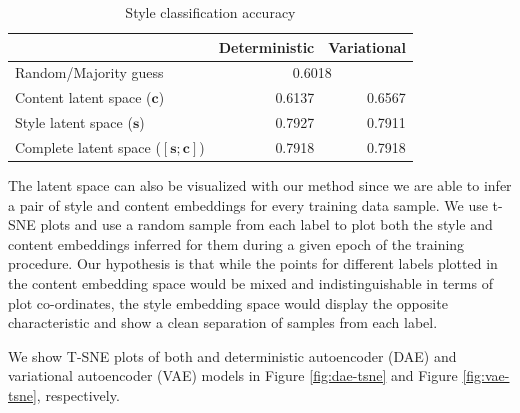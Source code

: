 \begin{table}[ht]
	\centering
	\begin{tabular}{| l | r | r |}
		\hline
		                                        & \textbf{Deterministic}       & \textbf{Variational} \\
		\hline \hline
		Random/Majority guess                   & \multicolumn{2}{|c|}{0.6018}                        \\ \hline \hline
		Content latent space  ($\bm c$)         & 0.6137                       & 0.6567               \\ \hline
		Style latent space ($\bm s$)            & 0.7927                       & 0.7911               \\ \hline
		Complete latent space ($[\bm s;\bm c]$) & 0.7918                       & 0.7918               \\
		\hline
	\end{tabular}
	\caption{Style classification accuracy}
	\label{tab:latent-space-classification}
\end{table}

The latent space can also be visualized with our method since we are able to infer a pair of style and content embeddings for every training data sample. We use t-SNE plots \citep{maaten2008visualizing} and use a random sample from each label to plot both the style and content embeddings inferred for them during a given epoch of the training procedure. Our hypothesis is that while the points for different labels plotted in the content embedding space would be mixed and indistinguishable in terms of plot co-ordinates, the style embedding space would display the opposite characteristic and show a clean separation of samples from each label.

We show T-SNE plots of both and deterministic autoencoder (DAE) and variational autoencoder (VAE) models in Figure \ref{fig:dae-tsne} and Figure \ref{fig:vae-tsne}, respectively.

